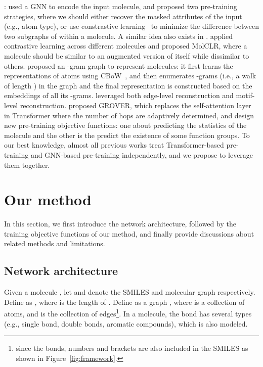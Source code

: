 \documentclass{article}
\begin{document}
: \citet{hu2019strategies} used a GNN to encode the input molecule, and proposed two pre-training strategies, where we should either recover the masked attributes of the input (e.g., atom type), or use constrastive learning~\cite{1640964,chen2020simple} to minimize the difference between two subgraphs of within a molecule. A similar idea also exists in \citet{li2020learn}. \citet{wang2021molclr} applied contrastive learning across different molecules and proposed MolCLR, where a molecule should be similar to an augmented version of itself while dissimilar to others. \citet{liu2019ngram} proposed an -gram graph to represent molecules: it first learns the representations of atoms using CBoW~\cite{mikolov2013efficient}, and then enumerates -grams (i.e., a walk of length ) in the graph and the final representation is constructed based on the embeddings of all its -grams. \citet{shen2020molgnn} leveraged both edge-level reconstruction and motif-level reconstruction. \citet{rong2020self} proposed GROVER, which replaces the self-attention layer in Transformer where the number of hops are adaptively determined, and design new pre-training objective functions: one about predicting the statistics of the molecule and the other is the predict the existence of some function groups. To our best knowledge, almost all previous works treat Transformer-based pre-training and GNN-based pre-training independently, and we propose to leverage them together.

\section{Our method}
In this section, we first introduce the network architecture, followed by the training objective functions of our method, and finally provide discussions about related methods and limitations.

\subsection{Network architecture}
Given a molecule , let  and  denote the SMILES and molecular graph respectively. Define  as , where  is the length of .
Define  as a graph , where  is a collection of atoms, and  is the collection of edges\footnote{ since the bonds, numbers and brackets are also included in the SMILES as shown in Figure~\ref{fig:framework}.}. In a molecule, the bond has several types (e.g., single bond, double bonds, aromatic compounds), which is also modeled. 
\end{document}
